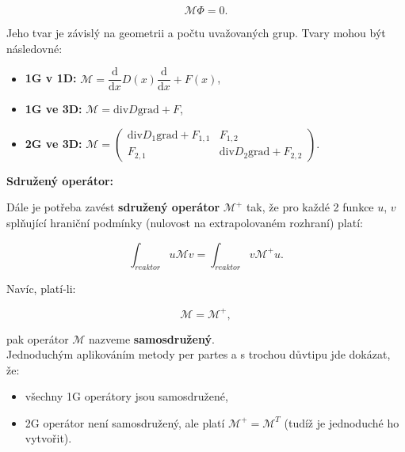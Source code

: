 \begin{equation}
  \boxed{
  \mathcal{M} \Phi = 0.
  \label{definice_maticovy_operator}}
\end{equation}

Jeho tvar je závislý na geometrii a počtu uvažovaných grup. Tvary mohou být následovné:

\begin{itemize}
  \item \textbf{1G v 1D:} \hspace{1.5cm} $\mathcal{M} = \dfrac{\text{d}}{\text{d}x} D(x) \dfrac{\text{d}}{\text{d}x} + F(x)$,
  \item \textbf{1G ve 3D:} \hspace{1.3cm} $\mathcal{M} = \text{div} D \text{grad} + F$,
  \item \textbf{2G ve 3D:} \hspace{1.3cm} $\mathcal{M} = \begin{pmatrix} \text{div} D_1 \text{grad} + F_{1,1} & F_{1,2} \\ F_{2,1} & \text{div} D_2 \text{grad} + F_{2,2} \end{pmatrix}$.
\end{itemize}

\textbf{Sdružený operátor:}

Dále je potřeba zavést \textbf{sdružený operátor} $\mathcal{M}^+$ tak, že pro každé 2 funkce $u$, $v$ splňující hraniční podmínky (nulovost na extrapolovaném rozhraní) platí:

\begin{equation}
  \boxed{
  \int_{reaktor} u \mathcal{M} v = \int_{reaktor} v \mathcal{M}^+ u.
  \label{definice_sdruzeny_operator}}
\end{equation}

Navíc, platí-li:

\begin{equation}
  \boxed{
  \mathcal{M} = \mathcal{M}^+,
  \label{definice_samosdruzeny_operator}}
\end{equation}

pak operátor $\mathcal{M}$ nazveme \textbf{samosdružený}.\\

Jednoduchým aplikováním metody per partes a s trochou důvtipu jde dokázat, že:

\begin{itemize}
  \item všechny 1G operátory jsou samosdružené,
  \item 2G operátor není samosdružený, ale platí $\mathcal{M}^+ = \mathcal{M}^T$ (tudíž je jednoduché ho vytvořit).
\end{itemize}

